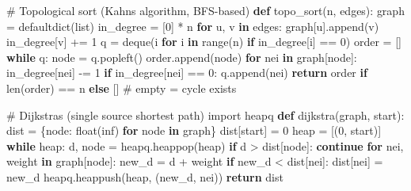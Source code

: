 \documentclass[11pt]{article}
\newenvironment{Shaded}{\begin{snugshade}}{\end{snugshade}}
\newcommand{\BuiltInTok}[1]{\textcolor[rgb]{0.50,0.55,0.55}{#1}}
\newcommand{\CommentTok}[1]{\textcolor[rgb]{0.48,0.49,0.49}{#1}}
\newcommand{\ControlFlowTok}[1]{\textcolor[rgb]{0.99,0.74,0.29}{\textbf{#1}}}
\newcommand{\DecValTok}[1]{\textcolor[rgb]{0.96,0.45,0.00}{#1}}
\newcommand{\ImportTok}[1]{\textcolor[rgb]{0.15,0.68,0.38}{#1}}
\newcommand{\KeywordTok}[1]{\textcolor[rgb]{0.81,0.81,0.76}{\textbf{#1}}}
\newcommand{\NormalTok}[1]{\textcolor[rgb]{0.81,0.81,0.76}{#1}}
\newcommand{\OperatorTok}[1]{\textcolor[rgb]{0.81,0.81,0.76}{#1}}
\newcommand{\StringTok}[1]{\textcolor[rgb]{0.96,0.31,0.31}{#1}}
\begin{document}
\begin{Shaded}
\begin{Highlighting}[]
\CommentTok{\# Topological sort (Kahn\textquotesingle{}s algorithm, BFS{-}based)}
\KeywordTok{def}\NormalTok{ topo\_sort(n, edges):}
\NormalTok{    graph }\OperatorTok{=}\NormalTok{ defaultdict(}\BuiltInTok{list}\NormalTok{)}
\NormalTok{    in\_degree }\OperatorTok{=}\NormalTok{ [}\DecValTok{0}\NormalTok{] }\OperatorTok{*}\NormalTok{ n}
    \ControlFlowTok{for}\NormalTok{ u, v }\KeywordTok{in}\NormalTok{ edges:}
\NormalTok{        graph[u].append(v)}
\NormalTok{        in\_degree[v] }\OperatorTok{+=} \DecValTok{1}
\NormalTok{    q }\OperatorTok{=}\NormalTok{ deque(i }\ControlFlowTok{for}\NormalTok{ i }\KeywordTok{in} \BuiltInTok{range}\NormalTok{(n) }\ControlFlowTok{if}\NormalTok{ in\_degree[i] }\OperatorTok{==} \DecValTok{0}\NormalTok{)}
\NormalTok{    order }\OperatorTok{=}\NormalTok{ []}
    \ControlFlowTok{while}\NormalTok{ q:}
\NormalTok{        node }\OperatorTok{=}\NormalTok{ q.popleft()}
\NormalTok{        order.append(node)}
        \ControlFlowTok{for}\NormalTok{ nei }\KeywordTok{in}\NormalTok{ graph[node]:}
\NormalTok{            in\_degree[nei] }\OperatorTok{{-}=} \DecValTok{1}
            \ControlFlowTok{if}\NormalTok{ in\_degree[nei] }\OperatorTok{==} \DecValTok{0}\NormalTok{:}
\NormalTok{                q.append(nei)}
    \ControlFlowTok{return}\NormalTok{ order }\ControlFlowTok{if} \BuiltInTok{len}\NormalTok{(order) }\OperatorTok{==}\NormalTok{ n }\ControlFlowTok{else}\NormalTok{ []  }\CommentTok{\# empty = cycle exists}

\CommentTok{\# Dijkstra\textquotesingle{}s (single source shortest path)}
\ImportTok{import}\NormalTok{ heapq}
\KeywordTok{def}\NormalTok{ dijkstra(graph, start):}
\NormalTok{    dist }\OperatorTok{=}\NormalTok{ \{node: }\BuiltInTok{float}\NormalTok{(}\StringTok{\textquotesingle{}inf\textquotesingle{}}\NormalTok{) }\ControlFlowTok{for}\NormalTok{ node }\KeywordTok{in}\NormalTok{ graph\}}
\NormalTok{    dist[start] }\OperatorTok{=} \DecValTok{0}
\NormalTok{    heap }\OperatorTok{=}\NormalTok{ [(}\DecValTok{0}\NormalTok{, start)]}
    \ControlFlowTok{while}\NormalTok{ heap:}
\NormalTok{        d, node }\OperatorTok{=}\NormalTok{ heapq.heappop(heap)}
        \ControlFlowTok{if}\NormalTok{ d }\OperatorTok{\textgreater{}}\NormalTok{ dist[node]: }\ControlFlowTok{continue}
        \ControlFlowTok{for}\NormalTok{ nei, weight }\KeywordTok{in}\NormalTok{ graph[node]:}
\NormalTok{            new\_d }\OperatorTok{=}\NormalTok{ d }\OperatorTok{+}\NormalTok{ weight}
            \ControlFlowTok{if}\NormalTok{ new\_d }\OperatorTok{\textless{}}\NormalTok{ dist[nei]:}
\NormalTok{                dist[nei] }\OperatorTok{=}\NormalTok{ new\_d}
\NormalTok{                heapq.heappush(heap, (new\_d, nei))}
    \ControlFlowTok{return}\NormalTok{ dist}
\end{Highlighting}
\end{Shaded}
\end{document}
